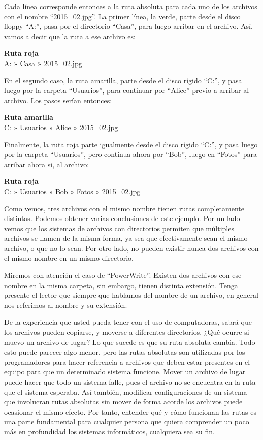 Cada línea corresponde entonces a la ruta absoluta para cada uno de los archivos
con el nombre ``2015\_02.jpg''. La primer línea, la verde, parte desde el disco
floppy ``A:'', pasa por el directorio ``Casa'', para luego arribar en el
archivo. Así, vamos a decir que la ruta a ese archivo es:

\begin{example}
    \textbf{Ruta roja}\\
    A: » Casa » 2015\_02.jpg
\end{example}

En el segundo caso, la ruta amarilla, parte desde el disco rígido ``C:'', y pasa
luego por la carpeta ``Usuarios'', para continuar por ``Alice'' previo a arribar
al archivo. Los pasos serían entonces:

\begin{example}
    \textbf{Ruta amarilla}\\
    C: » Usuarios » Alice » 2015\_02.jpg
\end{example}

Finalmente, la ruta roja parte igualmente desde el disco rígido ``C:'', y pasa
luego por la carpeta ``Usuarios'', pero continua ahora por ``Bob'', luego en
``Fotos'' para arribar ahora si, al archivo:

\begin{example}
    \textbf{Ruta roja}\\
    C: » Usuarios » Bob » Fotos » 2015\_02.jpg
\end{example}

Como vemos, tres archivos con el mismo nombre tienen rutas completamente
distintas. Podemos obtener varias conclusiones de este ejemplo. Por un lado
vemos que los sistemas de archivos con directorios permiten que múltiples
archivos se llamen de la misma forma, ya sea que efectivamente sean el mismo
archivo, o que no lo sean. Por otro lado, no pueden existir nunca dos archivos
con el mismo nombre en un mismo directorio.

Miremos con atención el caso de ``PowerWrite''. Existen dos archivos con ese
nombre en la misma carpeta, sin embargo, tienen distinta extensión. Tenga
presente el lector que siempre que hablamos del nombre de un archivo, en general
nos referimos al nombre y su extensión.

De la experiencia que usted pueda tener con el uso de computadoras, sabrá que
los archivos pueden copiarse, y moverse a diferentes directorios. ¿Qué ocurre si
muevo un archivo de lugar? Lo que sucede es que su ruta absoluta cambia. Todo
esto puede parecer algo menor, pero las rutas absolutas son utilizadas por los
programadores para hacer referencia a archivos que deben estar presentes en el
equipo para que un determinado sistema funcione. Mover un archivo de lugar puede
hacer que todo un sistema falle, pues el archivo no se encuentra en la ruta que
el sistema esperaba. Así también, modificar configuraciones de un sistema que
involucran rutas absolutas sin mover de forma acorde los archivos puede
ocasionar el mismo efecto. Por tanto, entender qué y cómo funcionan las rutas es
una parte fundamental para cualquier persona que quiera comprender un poco más
en profundidad los sistemas informáticos, cualquiera sea su fin.

